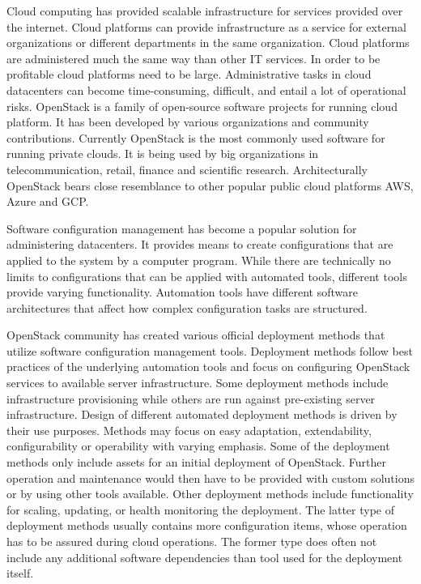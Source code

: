 Cloud computing has provided scalable infrastructure for services provided over
the internet. Cloud platforms can provide infrastructure as a service for
external organizations or different departments in the same organization. Cloud
platforms are administered much the same way than other IT services. In order
to be profitable cloud platforms need to be large. Administrative tasks in
cloud datacenters can become time-consuming, difficult, and entail a lot of
operational risks. OpenStack is a family of open-source software projects for
running cloud platform. It has been developed by various organizations and
community contributions. Currently OpenStack is the most commonly used software
for running private clouds. It is being used by big organizations in
telecommunication, retail, finance and scientific research. Architecturally
OpenStack bears close resemblance to other popular public cloud platforms AWS,
Azure and GCP.

Software configuration management has become a popular solution for
administering datacenters. It provides means to create configurations that are
applied to the system by a computer program. While there are technically no
limits to configurations that can be applied with automated tools, different
tools provide varying functionality. Automation tools have different software
architectures that affect how complex configuration tasks are structured.

OpenStack community has created various official deployment methods that
utilize software configuration management tools. Deployment methods follow best
practices of the underlying automation tools and focus on configuring OpenStack
services to available server infrastructure. Some deployment methods include
infrastructure provisioning while others are run against pre-existing server
infrastructure. Design of different automated deployment methods is driven by
their use purposes. Methods may focus on easy adaptation, extendability,
configurability or operability with varying emphasis. Some of the deployment
methods only include assets for an initial deployment of OpenStack. Further
operation and maintenance would then have to be provided with custom solutions
or by using other tools available. Other deployment methods include
functionality for scaling, updating, or health monitoring the deployment. The
latter type of deployment methods usually contains more configuration items,
whose operation has to be assured during cloud operations. The former type does
often not include any additional software dependencies than tool used for the
deployment itself.

